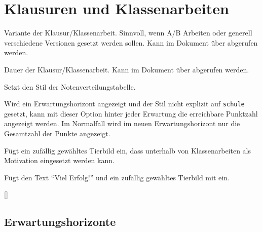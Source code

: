 \section{Klausuren und Klassenarbeiten}

\begin{options}
	Variante der Klausur/Klassenarbeit. Sinnvoll, wenn A/B Arbeiten oder generell verschiedene Versionen gesetzt werden sollen. Kann im Dokument über  abgerufen werden.
	
	Dauer der Klausur/Klassenarbeit. Kann im Dokument über  abgerufen werden.
	
	Setzt den Stil der Notenverteilungstabelle.
	
	Wird ein Erwartungshorizont angezeigt und der Stil nicht explizit auf \texttt{schule} gesetzt, kann mit dieser Option hinter jeder Erwartung die erreichbare Punktzahl angezeigt werden. Im Normalfall wird im neuen Erwartungshorizont nur die Gesamtzahl der Punkte angezeigt.
\end{options}

\begin{commands}
	Fügt ein zufällig gewähltes Tierbild ein, dass unterhalb von Klassenarbeiten als Motivation eingesetzt werden kann.
	
	Fügt den Text \enquote{Viel Erfolg!} und ein zufällig gewähltes Tierbild mit  ein.
	
	[]
\end{commands}

\subsection{Erwartungshorizonte}